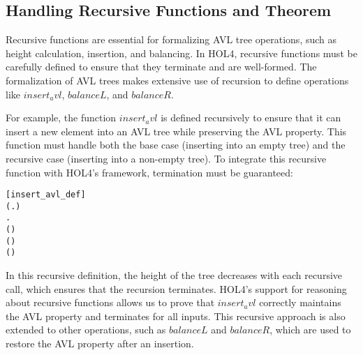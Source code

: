 \documentclass[12pt]{article}
\begin{document}
\subsection{Handling Recursive Functions and Theorem}

Recursive functions are essential for formalizing AVL tree operations, such as height calculation, insertion, and balancing. In HOL4, recursive functions must be carefully defined to ensure that they terminate and are well-formed. The formalization of AVL trees makes extensive use of recursion to define operations like \(insert_avl\), \(balanceL\), and \(balanceR\).

For example, the function \(insert_avl\) is defined recursively to ensure that it can insert a new element into an AVL tree while preserving the AVL property. This function must handle both the base case (inserting into an empty tree) and the recursive case (inserting into a non-empty tree). To integrate this recursive function with HOL4’s framework, termination must be guaranteed:

\begin{alltt}
[insert_avl_def]
\HOLTokenTurnstile{} (\HOLSymConst{\HOLTokenForall{}} .     \HOLSymConst{=}   ) \HOLSymConst{\HOLTokenConj{}}
   \HOLSymConst{\HOLTokenForall{}}      .
        (     ) \HOLSymConst{=}
       \HOLSymConst{=}        
        \HOLSymConst{\HOLTokenLt{}}      (   ) 
          (   )
\end{alltt}

In this recursive definition, the height of the tree decreases with each recursive call, which ensures that the recursion terminates. HOL4’s support for reasoning about recursive functions allows us to prove that \(insert_avl\) correctly maintains the AVL property and terminates for all inputs. This recursive approach is also extended to other operations, such as \(balanceL\) and \(balanceR\), which are used to restore the AVL property after an insertion.
\end{document}
